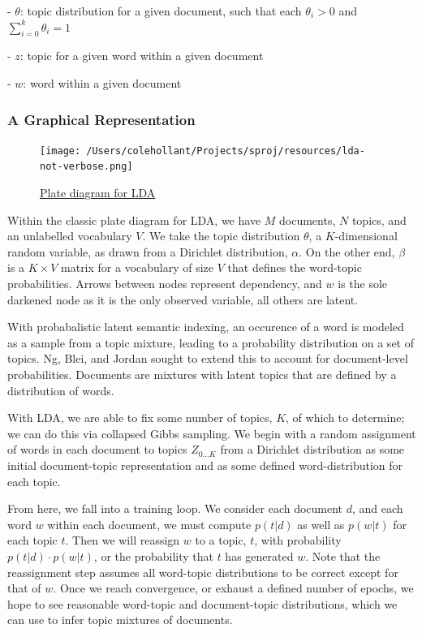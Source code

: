 \documentclass[11pt, twoside, reqno]{book}
\begin{document}
- $\theta$: topic distribution for a given document, such that each $\theta_i > 0$  and $\sum_{i=0}^{k} \theta_i=1$

- $z$: topic for a given word within a given document

- $w$: word within a given document

\subsubsection{A Graphical Representation}

\begin{figure}[h!]
    \centering
    \texttt{[image: /Users/colehollant/Projects/sproj/resources/lda-not-verbose.png]}
    
    \href{https://upload.wikimedia.org/wikipedia/commons/thumb/d/d3/Latent_Dirichlet_allocation.svg/593px-Latent_Dirichlet_allocation.svg.png}{Plate diagram for LDA}
\end{figure}


Within the classic plate diagram for LDA, we have $M$ documents, $N$ topics, and an unlabelled vocabulary $V$. We take the topic distribution $\theta$, a $K$-dimensional random variable, as drawn from a Dirichlet distribution, $\alpha$. On the other end, $\beta$ is a $K \times V$ matrix for a vocabulary of size $V$ that defines the word-topic probabilities. Arrows between nodes represent dependency, and $w$ is the sole darkened node as it is the only observed variable, all others are latent.

With probabalistic latent semantic indexing, an occurence of a word is modeled as a sample from a topic mixture, leading to a probability distribution on a set of topics. Ng, Blei, and Jordan sought to extend this to account for document-level probabilities. Documents are mixtures with latent topics that are defined by a distribution of words.

With LDA, we are able to fix some number of topics, $K$, of which to determine; we can do this via collapsed Gibbs sampling. We begin with a random assignment of words in each document to topics $Z_{0\dots K}$ from a Dirichlet distribution as some initial document-topic representation and as some defined word-distribution for each topic.

From here, we fall into a training loop. We consider each document $d$, and each word $w$ within each document, we must compute $p(t | d)$ as well as $p(w | t)$ for each topic $t$. Then we will reassign $w$ to a topic, $t$, with probability $p(t | d) \cdot p(w | t)$, or the probability that $t$ has generated $w$. Note that the reassignment step assumes all word-topic distributions to be correct except for that of $w$. Once we reach convergence, or exhaust a defined number of epochs, we hope to see reasonable word-topic and document-topic distributions, which we can use to infer topic mixtures of documents.
\end{document}
